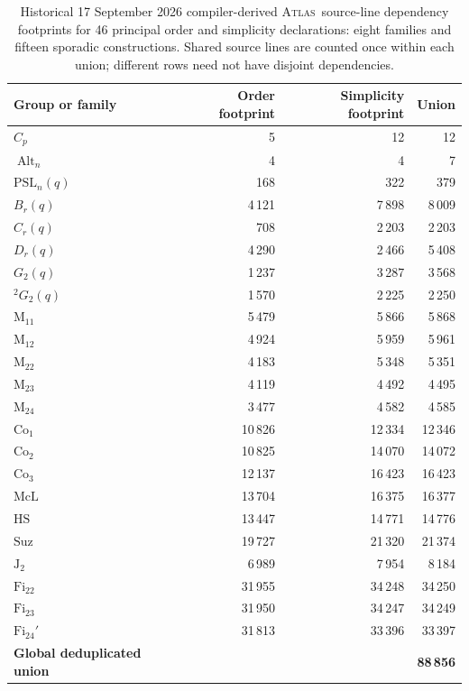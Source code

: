 \documentclass[11pt]{article}
\numberwithin{equation}{section}
\theoremstyle{definition}
\newcommand{\PSL}{\mathrm{PSL}}
\newcommand{\Alt}{\operatorname{Alt}}
\newcommand{\atlas}{\textsc{Atlas}}
\begin{document}
\begin{table}[!htbp]
\centering\small
\begin{tabular}{@{}lrrr@{}}
\toprule
Group or family & Order footprint & Simplicity footprint & Union \\
\midrule
$C_p$ & 5 & 12 & 12 \\
$\Alt_n$ & 4 & 4 & 7 \\
$\PSL_n(q)$ & 168 & 322 & 379 \\
$B_r(q)$ & 4\,121 & 7\,898 & 8\,009 \\
$C_r(q)$ & 708 & 2\,203 & 2\,203 \\
$D_r(q)$ & 4\,290 & 2\,466 & 5\,408 \\
$G_2(q)$ & 1\,237 & 3\,287 & 3\,568 \\
${}^2G_2(q)$ & 1\,570 & 2\,225 & 2\,250 \\
$\mathrm{M}_{11}$ & 5\,479 & 5\,866 & 5\,868 \\
$\mathrm{M}_{12}$ & 4\,924 & 5\,959 & 5\,961 \\
$\mathrm{M}_{22}$ & 4\,183 & 5\,348 & 5\,351 \\
$\mathrm{M}_{23}$ & 4\,119 & 4\,492 & 4\,495 \\
$\mathrm{M}_{24}$ & 3\,477 & 4\,582 & 4\,585 \\
$\mathrm{Co}_{1}$ & 10\,826 & 12\,334 & 12\,346 \\
$\mathrm{Co}_{2}$ & 10\,825 & 14\,070 & 14\,072 \\
$\mathrm{Co}_{3}$ & 12\,137 & 16\,423 & 16\,423 \\
$\mathrm{McL}$ & 13\,704 & 16\,375 & 16\,377 \\
$\mathrm{HS}$ & 13\,447 & 14\,771 & 14\,776 \\
$\mathrm{Suz}$ & 19\,727 & 21\,320 & 21\,374 \\
$\mathrm{J}_{2}$ & 6\,989 & 7\,954 & 8\,184 \\
$\mathrm{Fi}_{22}$ & 31\,955 & 34\,248 & 34\,250 \\
$\mathrm{Fi}_{23}$ & 31\,950 & 34\,247 & 34\,249 \\
$\mathrm{Fi}_{24}'$ & 31\,813 & 33\,396 & 33\,397 \\
\midrule
\textbf{Global deduplicated union} & & & \textbf{88\,856} \\
\bottomrule
\end{tabular}
\caption{Historical 17 September 2026 compiler-derived \atlas\ source-line dependency footprints for
46 principal order and simplicity declarations: eight families and
fifteen sporadic constructions. Shared source lines are counted once
within each union; different rows need not have disjoint dependencies.}
\label{tab:footprint}
\end{table}
\end{document}
